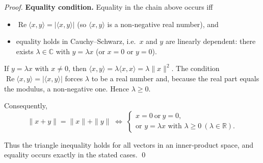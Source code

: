 \begin{proof}
\textbf{Equality condition.}  
Equality in the chain above occurs iff  

\begin{itemize}
\item $\operatorname{Re}\langle x,y\rangle = |\langle x,y\rangle|$ (so $\langle x,y\rangle$ is a non‑negative real number), and
\item equality holds in Cauchy–Schwarz, i.e.\ $x$ and $y$ are linearly dependent: there exists $\lambda\in\mathbb{C}$ with $y=\lambda x$ (or $x=0$ or $y=0$).
\end{itemize}
If $y=\lambda x$ with $x\neq0$, then $\langle x,y\rangle = \lambda\langle x,x\rangle = \lambda\|x\|^{2}$.  
The condition $\operatorname{Re}\langle x,y\rangle = |\langle x,y\rangle|$ forces $\lambda$ to be a real number and, because the real part equals the modulus, a non‑negative one. Hence $\lambda\ge0$.

Consequently,
\[
\|x+y\|=\|x\|+\|y\|
\;\Longleftrightarrow\;
\begin{cases}
x=0\ \text{or}\ y=0,\\[2pt]
\text{or } y=\lambda x \text{ with }\lambda\ge0\ (\lambda\in\mathbb{R}).
\end{cases}
\]

Thus the triangle inequality holds for all vectors in an inner‑product space, and equality occurs exactly in the stated cases. \qed
\end{proof}